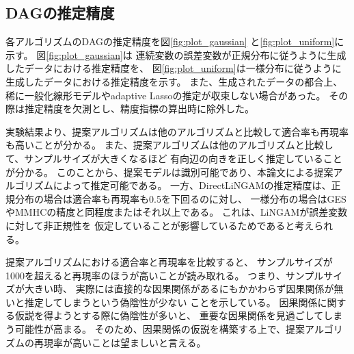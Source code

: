 
\subsection{DAGの推定精度}

各アルゴリズムのDAGの推定精度を図\ref{fig:plot_gaussian}
と\ref{fig:plot_uniform}に示す。
図\ref{fig:plot_gaussian}は
連続変数の誤差変数が正規分布に従うように生成したデータにおける推定精度を、
図\ref{fig:plot_uniform}は一様分布に従うように生成したデータにおける推定精度を示す。
また、生成されたデータの都合上、
稀に一般化線形モデルやadaptive Lassoの推定が収束しない場合があった。
その際は推定精度を欠測とし、精度指標の算出時に除外した。

実験結果より、提案アルゴリズムは他のアルゴリズムと比較して適合率も再現率も高いことが分かる。
また、提案アルゴリズムは他のアルゴリズムと比較して、サンプルサイズが大きくなるほど
有向辺の向きを正しく推定していることが分かる。
このことから、提案モデルは識別可能であり、本論文による提案アルゴリズムによって推定可能である。
一方、DirectLiNGAMの推定精度は、正規分布の場合は適合率も再現率も0.5を下回るのに対し、
一様分布の場合はGESやMMHCの精度と同程度またはそれ以上である。
これは、LiNGAM\cite{Shimizu2011-pd}が誤差変数に対して非正規性を
仮定していることが影響しているためであると考えられる。

提案アルゴリズムにおける適合率と再現率を比較すると、
サンプルサイズが1000を超えると再現率のほうが高いことが読み取れる。
つまり、サンプルサイズが大きい時、
実際には直接的な因果関係があるにもかかわらず因果関係が無いと推定してしまうという偽陰性が少ない
ことを示している。
因果関係に関する仮説を得ようとする際に偽陰性が多いと、
重要な因果関係を見過ごしてしまう可能性が高まる。
そのため、因果関係の仮説を構築する上で、提案アルゴリズムの再現率が高いことは望ましいと言える。

